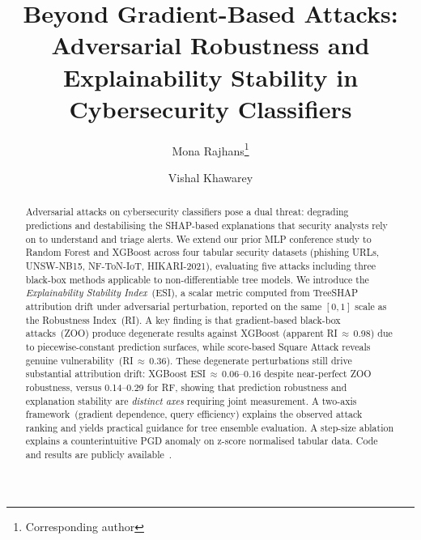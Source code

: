 \documentclass[runningheads]{llncs}
\begin{document}
\title{Beyond Gradient-Based Attacks: Adversarial Robustness and Explainability
Stability in Cybersecurity Classifiers}


\author{Mona Rajhans\thanks{Corresponding author} \and
        Vishal Khawarey}



\maketitle

\begin{abstract}
Adversarial attacks on cybersecurity classifiers pose a dual threat: degrading
predictions and destabilising the SHAP-based explanations that security analysts
rely on to understand and triage alerts.  We extend our prior MLP conference study to Random Forest and XGBoost across four
tabular security datasets (phishing URLs, UNSW-NB15, NF-ToN-IoT, HIKARI-2021), evaluating
five attacks including three black-box methods applicable to non-differentiable
tree models.  We introduce the \emph{Explainability Stability Index}~(ESI), a
scalar metric computed from TreeSHAP attribution drift under adversarial
perturbation, reported on the same $[0,1]$ scale as the Robustness Index~(RI).
A key finding is that gradient-based black-box attacks~(ZOO) produce degenerate
results against XGBoost (apparent RI\,$\approx$\,0.98) due to piecewise-constant
prediction surfaces, while score-based Square Attack reveals genuine
vulnerability~(RI\,$\approx$\,0.36).  These degenerate perturbations still drive substantial attribution drift:
XGBoost ESI\,$\approx$\,0.06--0.16 despite near-perfect ZOO robustness,
versus 0.14--0.29 for RF, showing that prediction robustness and explanation
stability are \emph{distinct axes} requiring joint measurement.  A two-axis
framework~(gradient dependence, query efficiency) explains the observed attack
ranking and yields practical guidance for tree ensemble evaluation.  A step-size
ablation explains a counter\-intuitive PGD anomaly on z-score normalised tabular
data.  Code and results are publicly available~\cite{khawarey2026code}.

\end{abstract}
\end{document}

